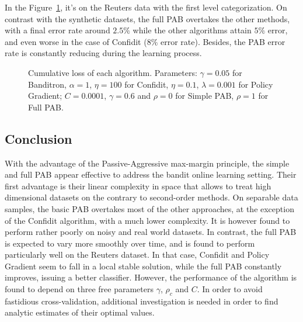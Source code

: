In the Figure~\ref{pic:PABRCV}, it's on the Reuters data with the first level categorization. On contrast with the synthetic datasets, the full PAB overtakes the other methods, with a final error rate around $2.5\%$ while the other algorithms attain $5\%$ error, and even worse in the case of Confidit ($8\%$ error rate). Besides, the PAB error rate is constantly reducing during the learning process.
\begin{figure}[!h]
\vspace{.2in}
\caption{Cumulative loss of each algorithm. Parameters: $\gamma = 0.05$ for Banditron, $\alpha=1$, $\eta=100$ for Confidit, $\eta =0.1$, $\lambda = 0.001$ for Policy Gradient; $C = 0.0001$, $\gamma = 0.6$ and $\rho = 0$ for Simple PAB, $\rho = 1$ for Full PAB.}
\label{pic:PABRCV}
\end{figure}

\subsection{Conclusion}
With the advantage of the Passive-Aggressive max-margin principle, the simple and full PAB appear effective to address the bandit online learning setting. Their first advantage is their linear complexity in space that allows to treat high dimensional datasets on the contrary to second-order methods. On separable data samples, the basic PAB overtakes most of the other approaches, at the exception of the Confidit algorithm, with a much lower complexity. It is however found to perform rather poorly on noisy and real world datasets. In contrast, the full PAB is expected to vary more smoothly over time, and is found to perform particularly well on the Reuters dataset. In that case, Confidit and Policy Gradient seem to fall in a local stable solution, while the full PAB constantly improves, issuing a better classifier.
However, the performance of the algorithm is found to depend on three free parameters $\gamma$, $\rho_c$ and $C$. In order to avoid fastidious cross-validation, additional investigation is needed in order to find analytic estimates of their optimal values. 